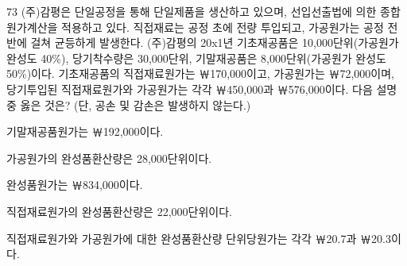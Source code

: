 \begin{question}{73}
(주)감평은 단일공정을 통해 단일제품을 생산하고 있으며, 선입선출법에 의한 종합원가계산을 적용하고 있다. 직접재료는 공정 초에 전량 투입되고, 가공원가는 공정 전반에 걸쳐 균등하게 발생한다. (주)감평의 20x1년 기초재공품은 10,000단위(가공원가 완성도 40\%), 당기착수량은 30,000단위, 기말재공품은 8,000단위(가공원가 완성도 50\%)이다. 기초재공품의 직접재료원가는 ￦170,000이고, 가공원가는 ￦72,000이며, 당기투입된 직접재료원가와 가공원가는 각각 ￦450,000과 ￦576,000이다. 다음 설명 중 옳은 것은? (단, 공손 및 감손은 발생하지 않는다.)
\begin{choices}
  \item 기말재공품원가는 ￦192,000이다.
  \item 가공원가의 완성품환산량은 28,000단위이다.
  \item 완성품원가는 ￦834,000이다.
  \item 직접재료원가의 완성품환산량은 22,000단위이다.
  \item 직접재료원가와 가공원가에 대한 완성품환산량 단위당원가는 각각 ￦20.7과 ￦20.3이다.
\end{choices}
\end{question}
